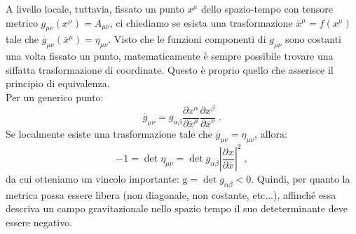\documentclass[12pt,a4paper]{report}
\theoremstyle{definition}
\newcommand{\pdev}[3][]{\frac{\partial^{#1} #2}{\partial #3^{#1}}}
\begin{document}
A livello locale, tuttavia, fissato un punto $x^{\mu}$ dello spazio-tempo con tensore metrico $g_{\mu\nu}(x^{\mu})=A_{\mu\nu}$, ci chiediamo se esista una trasformazione $\overline{x}^{\mu}=f(x^{\mu})$ tale che $\overline{g}_{\mu\nu}(\overline{x}^{\mu})=\eta_{\mu\nu}$. Visto che le funzioni componenti di $g_{\mu\nu}$ sono costanti una volta fissato un punto, matematicamente è sempre possibile trovare una siffatta trasformazione di coordinate. Questo è proprio quello che asserisce il principio di equivalenza. \\
Per un generico punto:
\begin{equation*}
\overline{g}_{\mu\nu}=g_{\alpha\beta}\frac{\partial x^{\alpha}}{\partial\overline{x}^{\mu}}\frac{\partial x^{\beta}}{\partial \overline{x}^{\nu}}\;.
\end{equation*}
Se localmente esiste una trasformazione tale che $\overline{g}_{\mu\nu}=\eta_{\mu\nu}$, allora:
\begin{equation}
-1=\det\eta_{\mu\nu}=\det g_{\alpha\beta}\left|\pdev{x}{\overline{x}}\right|^2\;,
\end{equation}
da cui otteniamo un vincolo importante: $\mathrm{g}=\det g_{\alpha\beta}<0$. Quindi, per quanto la metrica possa essere libera (non diagonale, non costante, etc...), affinché essa descriva un campo gravitazionale nello spazio tempo il suo deteterminante deve essere negativo.
\end{document}
